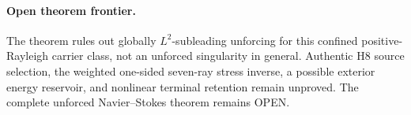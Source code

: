 \paragraph{Open theorem frontier.}
The theorem rules out globally $L^2$-subleading
unforcing for this confined positive-Rayleigh carrier class,
not an unforced singularity in general. Authentic H8 source
selection, the weighted one-sided seven-ray stress inverse,
a possible exterior energy reservoir, and nonlinear terminal
retention remain unproved. The complete unforced
Navier--Stokes theorem remains OPEN.

